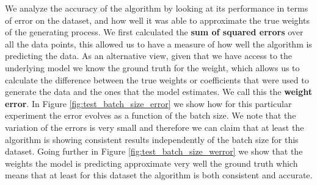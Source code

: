 \documentclass[11pt,a4paper]{article}
\begin{document}
We analyze the accuracy of the algorithm by looking at its performance in terms
of error on the dataset, and how well it was able to approximate the true weights
of the generating process.
We first calculated the \textbf{sum of squared errors} over all the data points, 
this allowed us to have a measure of how well the algorithm is predicting the data. 
As an alternative view, given that we have access to the underlying model we know the 
ground truth  for the weight, which allows us to calculate the difference between 
the true weights or coefficients that were used to generate the data and the ones that
the model estimates. We call this the \textbf{weight error}. In Figure
\ref{fig:test_batch_size_error} we show how for this particular experiment the
error evolves as a function of the batch size. We note that the variation of the errors
is very small and therefore we can claim that at least the algorithm is showing consistent
results independently of the batch size for this dataset. Going further in Figure 
\ref{fig:test_batch_size_werror} we show that the weights the model is predicting
approximate very well the ground truth which means that at least
for this dataset the algorithm is both consistent and accurate. 
\end{document}
